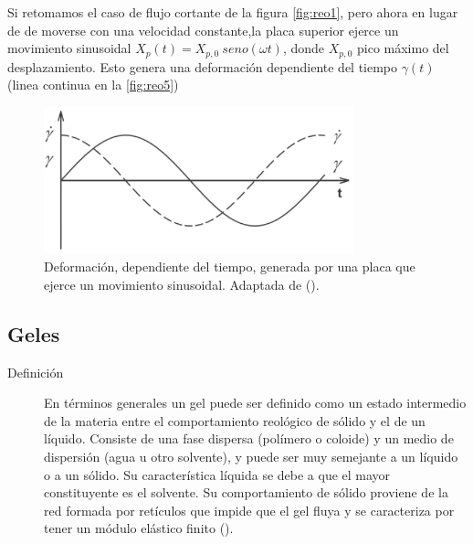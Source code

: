 Si retomamos el caso de flujo cortante de la figura \autoref{fig:reo1}, pero ahora en lugar de de moverse con una velocidad constante,la placa superior ejerce un movimiento sinusoidal $X_{p}(t) = X_{p,0}~seno(\omega t)$, donde $X_{p,0}$ pico máximo del desplazamiento. Esto genera una deformación dependiente del tiempo $\gamma(t)$ (linea continua en la 
\autoref{fig:reo5})

\begin{figure}
    \centering
    \includegraphics[width=0.8\textwidth]{Graphics/Reo5.png}
    \caption[Deformación en flujo oscilatorio]{Deformación, dependiente del tiempo, generada por una placa que ejerce un movimiento sinusoidal. Adaptada de ().}
    \label{fig:reo5}
\end{figure}
%
%
%
%
%
%
%
%
%
\subsection{Geles}
\begin{description}
\item[Definición] En términos generales un gel puede ser definido como un estado intermedio de la materia entre el comportamiento reológico de sólido y el de un líquido. Consiste de una fase dispersa (polímero o coloide) y un medio de dispersión (agua u otro solvente), y puede ser muy semejante a un líquido o a un sólido. Su característica líquida se debe a que el mayor constituyente es el solvente. Su comportamiento de sólido proviene de la red formada por retículos que impide que el gel fluya y se caracteriza por tener un módulo elástico finito (\cite{Nishinari2009}).
\end{description}


